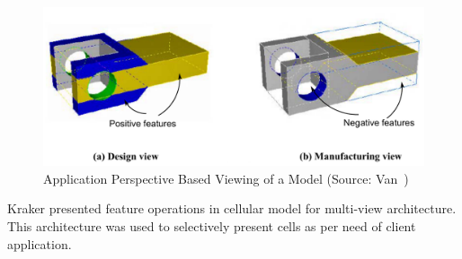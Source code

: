  
\begin{figure}[!h]
\centering     %
\includegraphics[width=0.85\linewidth,valign=t]{../Common/images/multiview.pdf}
\caption{Application Perspective Based Viewing of a Model (Source: Van~\cite{Van2000})}
\label{fig:litsurvey:multiview}
\end{figure}


Kraker \cite{Kraker1998} presented feature operations in cellular model for multi-view architecture. This architecture was used to selectively present cells as per need of client application. 





